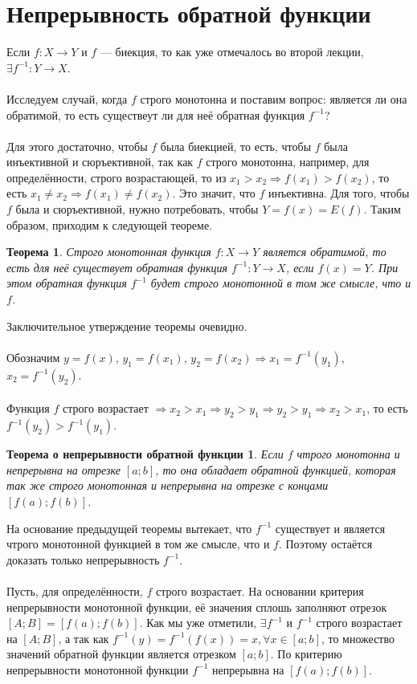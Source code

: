 \section{Непрерывность обратной функции}
Если $f: X \rightarrow Y$ и $f$ --- биекция, то как уже отмечалось во второй лекции, $\exists f^{-1}: Y \rightarrow X$.\\\\
Исследуем случай, когда $f$ строго монотонна и поставим вопрос: является ли она обратимой, то есть существеут ли для неё обратная функция $f^{-1}$?\\\\
Для этого достаточно, чтобы $f$ была биекцией, то есть, чтобы $f$ была инъективной и сюръективной, так как $f$  строго монотонна, например, для определённости, строго возрастающей, то из $x_1 > x_2 \Rightarrow f(x_1) > f(x_2)$, то есть $x_1 \ne x_2 \Rightarrow f(x_1) \ne f(x_2)$. Это значит, что $f$ инъективна. Для того, чтобы $f$  была и сюръективной, нужно потребовать, чтобы $Y = f(x) = E(f)$. Таким образом, приходим к следующей теореме.
\newtheorem*{theorem_11}{Теорема}
\begin{theorem_11}
	Строго монотонная функция $f: X \rightarrow Y$ является обратимой, то есть для неё существует обратная функция $f^{-1}: Y \rightarrow X$, если $f(x) = Y$. При этом обратная функция $f^{-1}$ будет строго монотонной в том же смысле, что и $f$.
\end{theorem_11}
\begin{Proof}
	Заключительное утверждение теоремы очевидно.\\\\
	Обозначим $y = f(x)$, $y_1 = f(x_1)$, $y_2 = f(x_2) \Rightarrow x_1 = f^{-1}(y_1)$, $x_2 = f^{-1}(y_2)$.\\\\
	Функция $f$ строго возрастает $\Rightarrow x_2 > x_1 \Rightarrow y_2 > y_1 \Rightarrow y_2 > y_1 \Rightarrow x_2 > x_1$, то есть $f^{-1}(y_2) > f^{-1}(y_1)$.
\end{Proof}
\newtheorem*{theorem_2}{Теорема о непрерывности обратной функции} 
\begin{theorem_2}
	Если $f$ чтрого монотонна и непрерывна на отрезке $[a; b]$, то она обладает обратной функцией, которая так же строго монотонная и непрерывна на отрезке с концами $[f(a); f(b)]$.
\end{theorem_2}
\begin{Proof}
	На основание предыдущей теоремы вытекает, что $f^{-1}$ существует и является чтрого монотонной функцией в том же смысле, что и $f$. Поэтому остаётся доказать только непрерывность $f^{-1}$.\\\\
	Пусть, для определённости, $f$ строго возрастает. На основании критерия непрерывности монотонной функции, её значения сплошь заполняют отрезок $[A; B] = [f(a); f(b)]$. Как мы уже отметили, $\exists f^{-1}$ и $f^{-1}$ строго возрастает на $[A; B]$, а так как $f^{-1}(y) = f^{-1}(f(x)) = x, \forall x \in [a; b]$, то множество значений обратной функции является отрезком $[a; b]$. По критерию непрерывности монотонной функции $f^{-1}$ непрерывна на $[f(a); f(b)]$.
\end{Proof}
